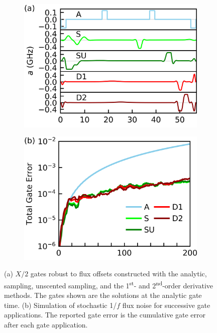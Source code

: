 \begin{figure}[ht]
  \begin{subfigure}{.4\textwidth}
    \includegraphics[width=\linewidth]{assets/f3a.png}
  \end{subfigure}\hspace{0.025\textwidth}
  \begin{subfigure}{.4\textwidth}
    \includegraphics[width=\linewidth]{assets/f3b.png}
  \end{subfigure}
  \caption{
    (a) $X/2$ gates robust to flux offsets constructed with the analytic,
    sampling, unscented sampling, and the 1\textsuperscript{st}-
    and 2\textsuperscript{nd}-order derivative methods. The gates shown
    are the solutions at the analytic gate time.
    (b) Simulation of stochastic 1/$f$ flux noise for
    successive gate applications. The reported gate error is the cumulative
    gate error after each gate application.
  }
  \label{fig:stochastic}
\end{figure}

